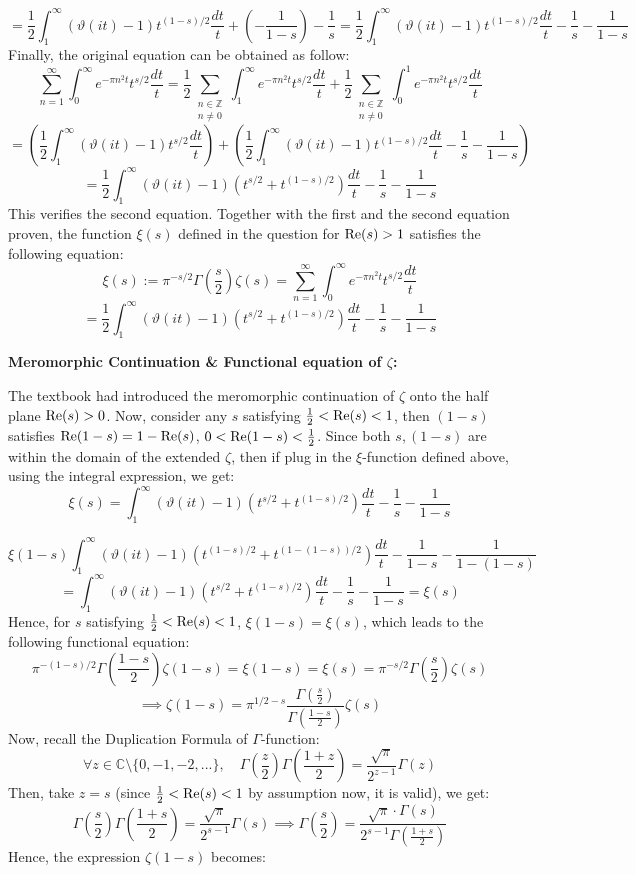\documentclass{article}
\begin{document}
$$ = \frac{1}{2}\int_{1}^{\infty}(\vartheta(it)-1)t^{(1-s)/2}\frac{dt}{t}+\left(-\frac{1}{1-s}\right) - \frac{1}{s} = \frac{1}{2}\int_{1}^{\infty}(\vartheta(it)-1)t^{(1-s)/2}\frac{dt}{t} - \frac{1}{s}-\frac{1}{1-s}$$
Finally, the original equation can be obtained as follow:
$$\sum_{n=1}^{\infty}\int_{0}^{\infty}e^{-\pi n^2t}t^{s/2}\frac{dt}{t} = \frac{1}{2}\sum_{\substack{n\in\mathbb{Z}\\n\neq 0}}\int_{1}^{\infty}e^{-\pi n^2t}t^{s/2}\frac{dt}{t}+\frac{1}{2}\sum_{\substack{n\in\mathbb{Z}\\n\neq 0}}\int_{0}^{1}e^{-\pi n^2t}t^{s/2}\frac{dt}{t}$$
$$ = \left(\frac{1}{2}\int_{1}^{\infty}(\vartheta(it)-1)t^{s/2}\frac{dt}{t}\right)+\left(\frac{1}{2}\int_{1}^{\infty}(\vartheta(it)-1)t^{(1-s)/2}\frac{dt}{t} - \frac{1}{s}-\frac{1}{1-s}\right)$$
$$ = \frac{1}{2}\int_{1}^{\infty}(\vartheta(it)-1)(t^{s/2}+t^{(1-s)/2})\frac{dt}{t}-\frac{1}{s}-\frac{1}{1-s}$$
This verifies the second equation. Together with the first and the second equation proven, the function $\xi(s)$ defined in the question for $\textmd{Re}(s)>1$ satisfies the following equation:
$$\xi(s):=\pi ^{-s/2}\Gamma\left(\frac{s}{2}\right)\zeta(s)=\sum_{n=1}^{\infty}\int_{0}^{\infty}e^{-\pi n^2t}t^{s/2}\frac{dt}{t}$$
$$=\frac{1}{2}\int_{1}^{\infty}(\vartheta(it)-1)(t^{s/2}+t^{(1-s)/2})\frac{dt}{t}-\frac{1}{s}-\frac{1}{1-s}$$

\hfil

\textbf{Meromorphic Continuation \& Functional equation of $\zeta$:}

The textbook had introduced the meromorphic continuation of $\zeta$ onto the half plane $\textmd{Re}(s)>0$. Now, consider any $s$ satisfying $\frac{1}{2}<\textmd{Re}(s)<1$, then $(1-s)$ satisfies $\textmd{Re}(1-s)=1-\textmd{Re}(s)$, $0<\textmd{Re}(1-s)<\frac{1}{2}$. Since both $s,(1-s)$ are within the domain of the extended $\zeta$, then if plug in the $\xi$-function defined above, using the integral expression, we get:
$$\xi(s) = \int_{1}^{\infty}(\vartheta(it)-1)(t^{s/2}+t^{(1-s)/2})\frac{dt}{t}-\frac{1}{s}-\frac{1}{1-s}$$

$$\xi(1-s)\int_{1}^{\infty}(\vartheta(it)-1)(t^{(1-s)/2}+t^{(1-(1-s))/2})\frac{dt}{t}-\frac{1}{1-s}-\frac{1}{1-(1-s)}$$
$$ = \int_{1}^{\infty}(\vartheta(it)-1)(t^{s/2}+t^{(1-s)/2})\frac{dt}{t}-\frac{1}{s}-\frac{1}{1-s} = \xi(s)$$
Hence, for $s$ satisfying $\frac{1}{2}<\textmd{Re}(s)<1$, $\xi(1-s)=\xi(s)$, which leads to the following functional equation:
$$\pi^{-(1-s)/2}\Gamma\left(\frac{1-s}{2}\right)\zeta(1-s)=\xi(1-s)=\xi(s)=\pi^{-s/2}\Gamma\left(\frac{s}{2}\right)\zeta(s)$$
$$\implies \zeta(1-s) = \pi ^{1/2-s}\frac{\Gamma\left(\frac{s}{2}\right)}{\Gamma\left(\frac{1-s}{2}\right)}\zeta(s)$$
Now, recall the Duplication Formula of $\Gamma$-function:
$$\forall z\in \mathbb{C}\setminus\{0,-1,-2,...\},\quad \Gamma\left(\frac{z}{2}\right)\Gamma\left(\frac{1+z}{2}\right)=\frac{\sqrt{\pi}}{2^{z-1}}\Gamma(z)$$
Then, take $z=s$ (since $\frac{1}{2}<\textmd{Re}(s)<1$ by assumption now, it is valid), we get:
$$\Gamma\left(\frac{s}{2}\right)\Gamma\left(\frac{1+s}{2}\right)=\frac{\sqrt{\pi}}{2^{s-1}}\Gamma(s)\implies \Gamma\left(\frac{s}{2}\right)=\frac{\sqrt{\pi }\cdot\Gamma(s)}{2^{s-1}\Gamma\left(\frac{1+s}{2}\right)}$$
Hence, the expression $\zeta(1-s)$ becomes:
\end{document}
